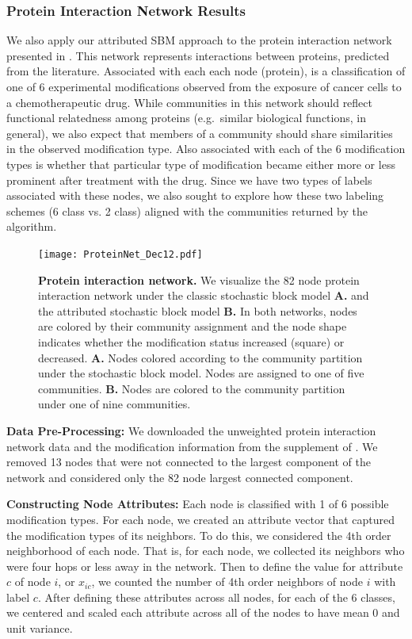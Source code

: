 \subsubsection{Protein Interaction Network Results}
We also apply our attributed SBM approach to the protein interaction network presented in \cite{bonacci}. This network represents interactions between proteins, predicted from the literature. Associated with each each node (protein), is a classification of one of 6 experimental modifications observed from the exposure of cancer cells to a chemotherapeutic drug. While communities in this network should reflect functional relatedness among proteins (e.g.\ similar biological functions, in general), we also expect that members of a community should share similarities in the observed modification type. Also associated with each of the 6 modification types is whether that particular type of modification became either more or less prominent after treatment with the drug. Since we have two types of labels associated with these nodes, we also sought to explore how these two labeling schemes (6 class vs. 2 class) aligned with the communities returned by the algorithm. 

\begin{figure}[h!]
\begin{center}
\texttt{[image: ProteinNet\_Dec12.pdf]}
\caption{{\bf Protein interaction network.} We visualize the 82 node protein interaction network under the classic stochastic block model {\bf A.} and the attributed stochastic block model {\bf B.} In both networks, nodes are colored by their community assignment and the node shape indicates whether the modification status increased (square) or decreased. {\bf A.} Nodes colored according to the community partition under the stochastic block model. Nodes are assigned to one of five communities. {\bf B.} Nodes are colored to the community partition under one of nine communities.}
\label{AttFig7}
\end{center}
\end{figure}

{\bf Data Pre-Processing: } We downloaded the unweighted protein interaction network data and the modification information from the supplement of \cite{bonacci}. We removed 13 nodes that were not connected to the largest component of the network and considered only the 82 node largest connected component.

{\bf Constructing Node Attributes:}
Each node is classified with 1 of 6 possible modification types. For each node, we created an attribute vector that captured the modification types of its neighbors. To do this, we considered the 4th order neighborhood of each node. That is, for each node, we collected its neighbors who were four hops or less away in the network. Then to define the value for attribute $c$ of node $i$, or $x_{ic}$, we counted the number of 4th order neighbors of node $i$ with label $c$. After defining these attributes across all nodes, for each of the 6 classes, we centered and scaled each attribute across all of the nodes to have mean 0 and unit variance. 

